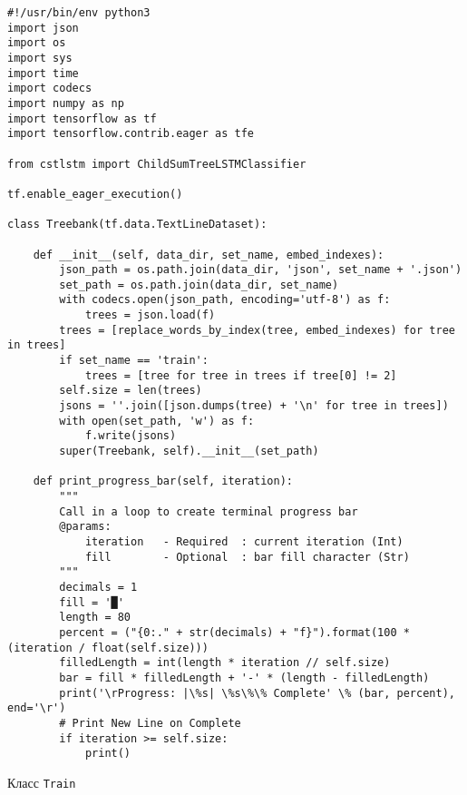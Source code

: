 \begin{lstlisting}[style=app]
#!/usr/bin/env python3
import json
import os
import sys
import time
import codecs
import numpy as np
import tensorflow as tf
import tensorflow.contrib.eager as tfe

from cstlstm import ChildSumTreeLSTMClassifier

tf.enable_eager_execution()

class Treebank(tf.data.TextLineDataset):

    def __init__(self, data_dir, set_name, embed_indexes):
        json_path = os.path.join(data_dir, 'json', set_name + '.json')
        set_path = os.path.join(data_dir, set_name)
        with codecs.open(json_path, encoding='utf-8') as f:
            trees = json.load(f)
        trees = [replace_words_by_index(tree, embed_indexes) for tree in trees]
        if set_name == 'train':
            trees = [tree for tree in trees if tree[0] != 2]
        self.size = len(trees)
        jsons = ''.join([json.dumps(tree) + '\n' for tree in trees])
        with open(set_path, 'w') as f:
            f.write(jsons)
        super(Treebank, self).__init__(set_path)

    def print_progress_bar(self, iteration):
        """
        Call in a loop to create terminal progress bar
        @params:
            iteration   - Required  : current iteration (Int)
            fill        - Optional  : bar fill character (Str)
        """
        decimals = 1
        fill = '█'
        length = 80
        percent = ("{0:." + str(decimals) + "f}").format(100 * (iteration / float(self.size)))
        filledLength = int(length * iteration // self.size)
        bar = fill * filledLength + '-' * (length - filledLength)
        print('\rProgress: |\%s| \%s\%\% Complete' \% (bar, percent), end='\r')
        # Print New Line on Complete
        if iteration >= self.size:
            print()

\end{lstlisting}

\begin{center}Класс \texttt{Train}\end{center}


